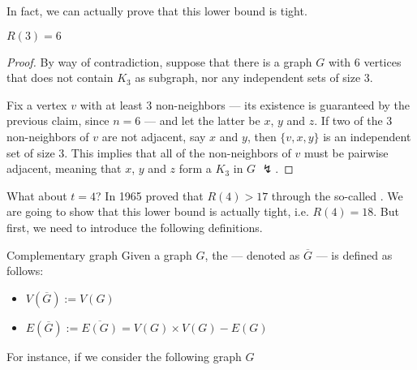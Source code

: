 \documentclass[a4paper, 12pt]{report}
\begin{document}
    In fact, we can actually prove that this lower bound is tight.
    
    \begin{framedthm}[label={r3 = 6}]{}
        $R(3) = 6$
    \end{framedthm}
    
    \begin{proof}
        By way of contradiction, suppose that there is a graph $G$ with 6 vertices that does not contain $K_3$ as subgraph, nor any independent sets of size 3.


        Fix a vertex $v$ with at least 3 non-neighbors --- its existence is guaranteed by the previous claim, since $n = 6$ --- and let the latter be $x$, $y$ and $z$. If two of the 3 non-neighbors of $v$ are not adjacent, say $x$ and $y$, then $\{v, x, y\}$ is an independent set of size 3. This implies that all of the non-neighbors of $v$ must be pairwise adjacent, meaning that $x$, $y$ and $z$ form a $K_3$ in $G$ $\lightning$.
    \end{proof}

    What about $t = 4$? In 1965 \textcite{kalbfleisch} proved that $R(4) > 17$ through the so-called . We are going to show that this lower bound is actually tight, i.e. $R(4) = 18$. But first, we need to introduce the following definitions.

    \begin{frameddefn}{Complementary graph}
        Given a graph $G$, the  --- denoted as $\overline G$ --- is defined as follows:

        \begin{itemize}
            \item $V(\overline G) := V(G)$
            \item $E(\overline G) := \overline{E(G)} = V(G) \times V(G) - E(G)$
        \end{itemize}
    \end{frameddefn}

    For instance, if we consider the following graph $G$
\end{document}
